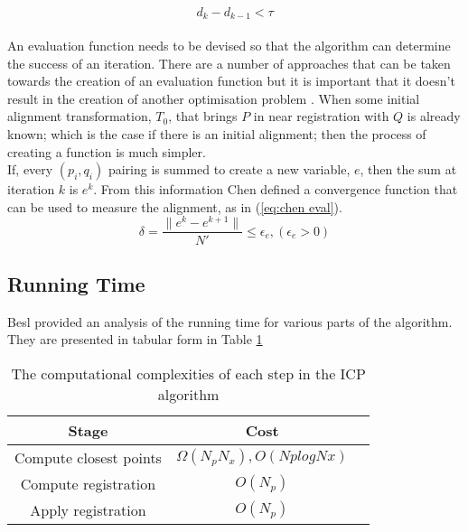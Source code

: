 \begin{equation}
    \label{eq:icp termination}
    d_k - d_{k-1} < \tau
\end{equation} \\

An evaluation function needs to be devised so that the algorithm can determine the success of an iteration. There are a number of approaches that can be taken towards the creation of an evaluation function but it is important that it doesn't result in the creation of another optimisation problem \cite{chen92}. When some initial alignment transformation, $T_0$, that brings $P$ in near registration with $Q$ is already known; which is the case if there is an initial alignment; then the process of creating a function is much simpler. \\

If, every $(p_i,q_i)$ pairing is summed to create a new variable, $e$, then the sum at iteration $k$ is $e^k$. From this information Chen defined a convergence function that can be used to measure the alignment, as in (\ref{eq:chen eval}).\\

\begin{equation}
    \label{eq:chen eval}
     \delta = \frac{\|e^k - e^{k+1} \|}{N'} \leq \epsilon_e, (\epsilon_e > 0)
\end{equation}


\subsection{Running Time}
Besl provided an analysis of the running time for various parts of the algorithm. They are presented in tabular form in Table \ref{tab:icp run time}

\begin{table}
    \label{tab:icp run time}
    \centering
    \begin{tabular}{| c | c | c| }
    \hline
    Stage & Cost \\ \hline
    Compute closest points & $\Omega (N_pN_x), O(NplogNx)$ \\ \hline
    Compute registration & $O(N_p)$\\ \hline
    Apply registration & $O(N_p)$\\ \hline
    \end{tabular}
    \caption{The computational complexities of each step in the ICP algorithm}
\end{table} \\

